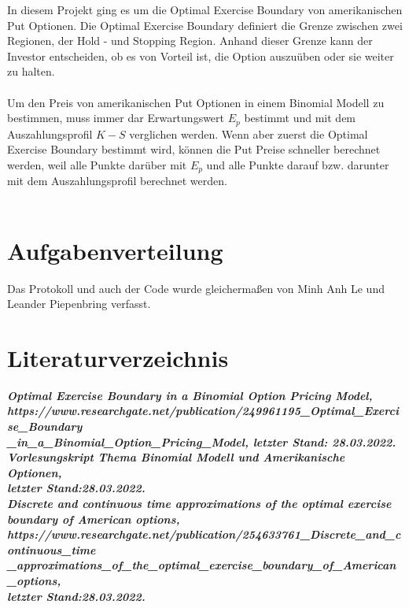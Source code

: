 \documentclass[12pt,a4paper]{article}
\begin{document}
\begin{text}
In diesem Projekt ging es um die Optimal Exercise Boundary von amerikanischen Put Optionen. Die Optimal Exercise Boundary definiert die Grenze zwischen zwei Regionen, der Hold - und Stopping Region. Anhand dieser Grenze kann der Investor entscheiden, ob es von Vorteil ist, die Option auszuüben oder sie weiter zu halten.
\\\\
Um den Preis von amerikanischen Put Optionen in einem Binomial Modell zu bestimmen, muss immer dar Erwartungswert $E_p$ bestimmt und mit dem Auszahlungsprofil $K-S$ verglichen werden. Wenn aber zuerst die Optimal Exercise Boundary bestimmt wird, können die Put Preise schneller berechnet werden, weil alle Punkte darüber mit $E_p$ und alle Punkte darauf bzw. darunter mit dem Auszahlungsprofil berechnet werden.
\\\\
\part{Aufgabenverteilung}
Das Protokoll und auch der Code wurde gleichermaßen von Minh Anh Le und Leander Piepenbring verfasst.
\newpage
\part * { Literaturverzeichnis }

 \bfseries\itshape\underline{}{Optimal Exercise Boundary in a Binomial Option Pricing Model},\mdseries \\ {https://www.researchgate.net/publication/249961195\_Optimal\_Exercise\_Boundary\\\_in\_a\_Binomial\_Option\_Pricing\_Model, letzter Stand: 28.03.2022}. \\

 \bfseries\itshape\underline{}{Vorlesungskript Thema Binomial Modell und Amerikanische Optionen},\mdseries \\
{letzter Stand:28.03.2022}. \\

 \bfseries\itshape\underline{}{Discrete and continuous time approximations of the optimal exercise boundary of American options},\mdseries\\ {https://www.researchgate.net/publication/254633761\_Discrete\_and\_continuous\_time\\\_approximations\_of\_the\_optimal\_exercise\_boundary\_of\_American\_options,\\ letzter Stand:28.03.2022}. \\ 


\end{text}
\end{document}
